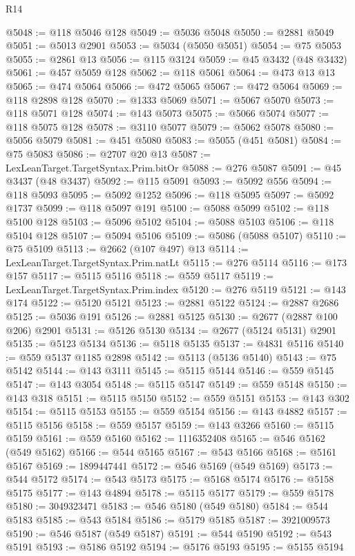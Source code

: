\begin{lexlean}{R14}
\begin{coremodule}
{{{{{{{{{{{{{{{{{{{{{{{{{{{{{{{{{{{{{{{{{{{{{{{{{{{{{{{{{{{{{{{{{{{{{{{{{{{{{{{{{{@5048 := @118 @5046 @128
@5049 := @5036 @5048
@5050 := @2881 @5049
@5051 := @5013 @2901
@5053 := @5034 (@5050 @5051)
@5054 := @75 @5053
@5055 := @2861 @13
@5056 := @115 @3124
@5059 := @45 @3432 (@48 @3432)
@5061 := @457 @5059 @128
@5062 := @118 @5061
@5064 := @473 @13 @13
@5065 := @474 @5064
@5066 := @472 @5065
@5067 := @472 @5064
@5069 := @118 @2898 @128
@5070 := @1333 @5069
@5071 := @5067 @5070
@5073 := @118 @5071 @128
@5074 := @143 @5073
@5075 := @5066 @5074
@5077 := @118 @5075 @128
@5078 := @3110 @5077
@5079 := @5062 @5078
@5080 := @5056 @5079
@5081 := @451 @5080
@5083 := @5055 (@451 @5081)
@5084 := @75 @5083
@5086 := @2707 @20 @13
@5087 := LexLeanTarget.TargetSyntax.Prim.bitOr
@5088 := @276 @5087
@5091 := @45 @3437 (@48 @3437)
@5092 := @115 @5091
@5093 := @5092 @556
@5094 := @118 @5093
@5095 := @5092 @1252
@5096 := @118 @5095
@5097 := @5092 @1737
@5099 := @118 @5097 @191
@5100 := @5088 @5099
@5102 := @118 @5100 @128
@5103 := @5096 @5102
@5104 := @5088 @5103
@5106 := @118 @5104 @128
@5107 := @5094 @5106
@5109 := @5086 (@5088 @5107)
@5110 := @75 @5109
@5113 := @2662 (@107 @497) @13
@5114 := LexLeanTarget.TargetSyntax.Prim.natLt
@5115 := @276 @5114
@5116 := @173 @157
@5117 := @5115 @5116
@5118 := @559 @5117
@5119 := LexLeanTarget.TargetSyntax.Prim.index
@5120 := @276 @5119
@5121 := @143 @174
@5122 := @5120 @5121
@5123 := @2881 @5122
@5124 := @2887 @2686
@5125 := @5036 @191
@5126 := @2881 @5125
@5130 := @2677 (@2887 @100 @206) @2901
@5131 := @5126 @5130
@5134 := @2677 (@5124 @5131) @2901
@5135 := @5123 @5134
@5136 := @5118 @5135
@5137 := @4831 @5116
@5140 := @559 @5137 @1185 @2898
@5142 := @5113 (@5136 @5140)
@5143 := @75 @5142
@5144 := @143 @3111
@5145 := @5115 @5144
@5146 := @559 @5145
@5147 := @143 @3054
@5148 := @5115 @5147
@5149 := @559 @5148
@5150 := @143 @318
@5151 := @5115 @5150
@5152 := @559 @5151
@5153 := @143 @302
@5154 := @5115 @5153
@5155 := @559 @5154
@5156 := @143 @4882
@5157 := @5115 @5156
@5158 := @559 @5157
@5159 := @143 @3266
@5160 := @5115 @5159
@5161 := @559 @5160
@5162 := 1116352408
@5165 := @546 @5162 (@549 @5162)
@5166 := @544 @5165
@5167 := @543 @5166
@5168 := @5161 @5167
@5169 := 1899447441
@5172 := @546 @5169 (@549 @5169)
@5173 := @544 @5172
@5174 := @543 @5173
@5175 := @5168 @5174
@5176 := @5158 @5175
@5177 := @143 @4894
@5178 := @5115 @5177
@5179 := @559 @5178
@5180 := 3049323471
@5183 := @546 @5180 (@549 @5180)
@5184 := @544 @5183
@5185 := @543 @5184
@5186 := @5179 @5185
@5187 := 3921009573
@5190 := @546 @5187 (@549 @5187)
@5191 := @544 @5190
@5192 := @543 @5191
@5193 := @5186 @5192
@5194 := @5176 @5193
@5195 := @5155 @5194
}}}}}}}}}}}}}}}}}}}}}}}}}}}}}}}}}}}}}}}}}}}}}}}}}}}}}}}}}}}}}}}}}}}}}}}}}}}}}}}}}}
\end{coremodule}
\end{lexlean}

